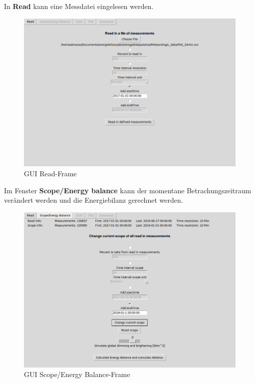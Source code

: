 \documentclass[12pt,a4paper]{article}
\begin{document}
In \textbf{Read} kann eine Messdatei eingelesen werden. 

\begin{figure}[H]
\centering
\includegraphics[width=1\textwidth]{pictures/GUI/Read_Frame.png}
\caption{GUI Read-Frame}
\label{fig:GUI Read-Frame}
\end{figure}

Im Fenster \textbf{Scope/Energy balance} kann der momentane Betrachungszeitraum verändert werden und die Energiebilanz gerechnet werden. 

\begin{figure}[H]
\centering
\includegraphics[width=1\textwidth]{pictures/GUI/Scope_Energy_Balance_Frame.png}
\caption{GUI Scope/Energy Balance-Frame}
\label{fig:GUI Scope/Energy Balance-Frame}
\end{figure}
\end{document}

